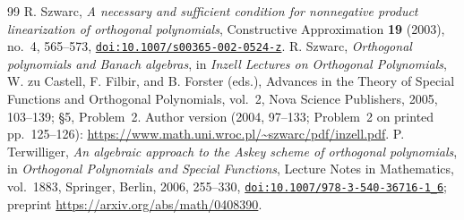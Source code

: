 \begin{thebibliography}{99}
 R. Szwarc, \emph{A necessary and sufficient condition for nonnegative product linearization of orthogonal polynomials}, Constructive Approximation \textbf{19} (2003), no.~4, 565--573, \href{https://doi.org/10.1007/s00365-002-0524-z}{\nolinkurl{doi:10.1007/s00365-002-0524-z}}.
 R. Szwarc, \emph{Orthogonal polynomials and Banach algebras}, in \emph{Inzell Lectures on Orthogonal Polynomials}, W. zu Castell, F. Filbir, and B. Forster (eds.), Advances in the Theory of Special Functions and Orthogonal Polynomials, vol.~2, Nova Science Publishers, 2005, 103--139; \S5, Problem~2. Author version (2004, 97--133; Problem~2 on printed pp.~125--126): \url{https://www.math.uni.wroc.pl/~szwarc/pdf/inzell.pdf}.
 P. Terwilliger, \emph{An algebraic approach to the Askey scheme of orthogonal polynomials}, in \emph{Orthogonal Polynomials and Special Functions}, Lecture Notes in Mathematics, vol.~1883, Springer, Berlin, 2006, 255--330, \href{https://doi.org/10.1007/978-3-540-36716-1_6}{\nolinkurl{doi:10.1007/978-3-540-36716-1_6}}; preprint \url{https://arxiv.org/abs/math/0408390}.
\end{thebibliography}

